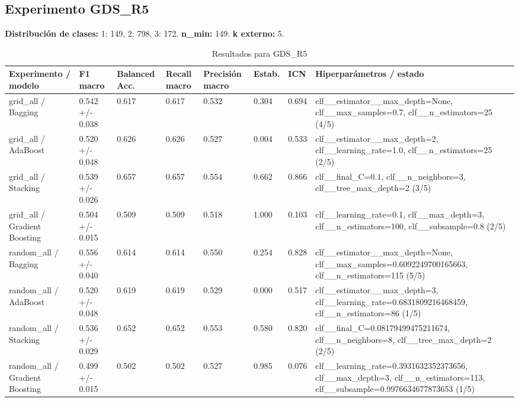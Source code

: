 \documentclass{article}
\begin{document}
\subsection*{Experimento GDS\_R5}
\noindent\textbf{Distribuci\'on de clases:} 1: 149, 2: 798, 3: 172. \textbf{n\_min:} 149. \textbf{k externo:} 5.
\begin{table}[h]
\centering
\caption{Resultados para GDS\_R5}
\scriptsize
\begin{tabular}{p{3.2cm}p{2.0cm}p{1.6cm}p{1.6cm}p{1.8cm}p{1.5cm}p{1.4cm}p{3.4cm}}
\toprule
Experimento / modelo & F1 macro & Balanced Acc. & Recall macro & Precisi\'on macro & Estab. & ICN & Hiperpar\'ametros / estado \\
\midrule
grid\_all / Bagging & 0.542 +/- 0.038 & 0.617 & 0.617 & 0.532 & 0.304 & 0.694 & clf\_\_estimator\_\_max\_depth=None, clf\_\_max\_samples=0.7, clf\_\_n\_estimators=25 (4/5) \\
grid\_all / AdaBoost & 0.520 +/- 0.048 & 0.626 & 0.626 & 0.527 & 0.004 & 0.533 & clf\_\_estimator\_\_max\_depth=2, clf\_\_learning\_rate=1.0, clf\_\_n\_estimators=25 (2/5) \\
grid\_all / Stacking & 0.539 +/- 0.026 & 0.657 & 0.657 & 0.554 & 0.662 & 0.866 & clf\_\_final\_C=0.1, clf\_\_n\_neighbors=3, clf\_\_tree\_max\_depth=2 (3/5) \\
grid\_all / Gradient Boosting & 0.504 +/- 0.015 & 0.509 & 0.509 & 0.518 & 1.000 & 0.103 & clf\_\_learning\_rate=0.1, clf\_\_max\_depth=3, clf\_\_n\_estimators=100, clf\_\_subsample=0.8 (2/5) \\
random\_all / Bagging & 0.556 +/- 0.040 & 0.614 & 0.614 & 0.550 & 0.254 & 0.828 & clf\_\_estimator\_\_max\_depth=None, clf\_\_max\_samples=0.6092249700165663, clf\_\_n\_estimators=115 (5/5) \\
random\_all / AdaBoost & 0.520 +/- 0.048 & 0.619 & 0.619 & 0.529 & 0.000 & 0.517 & clf\_\_estimator\_\_max\_depth=3, clf\_\_learning\_rate=0.6831809216468459, clf\_\_n\_estimators=86 (1/5) \\
random\_all / Stacking & 0.536 +/- 0.029 & 0.652 & 0.652 & 0.553 & 0.580 & 0.820 & clf\_\_final\_C=0.08179499475211674, clf\_\_n\_neighbors=8, clf\_\_tree\_max\_depth=2 (2/5) \\
random\_all / Gradient Boosting & 0.499 +/- 0.015 & 0.502 & 0.502 & 0.527 & 0.985 & 0.076 & clf\_\_learning\_rate=0.3931632352373656, clf\_\_max\_depth=3, clf\_\_n\_estimators=113, clf\_\_subsample=0.9976634677873653 (1/5) \\
\bottomrule
\end{tabular}
\end{table}
\end{document}
